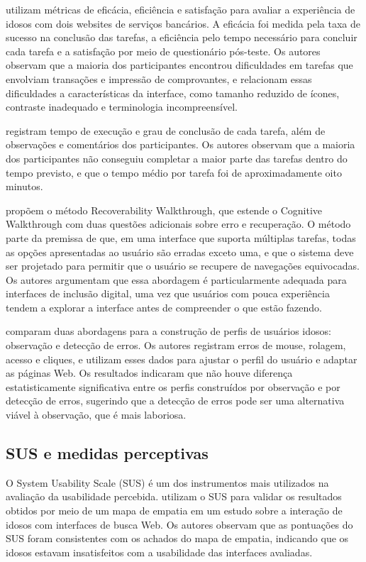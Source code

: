 \cite{gatsou2017seniors} utilizam métricas de eficácia, eficiência e satisfação para avaliar a experiência de idosos com dois websites de serviços bancários. A eficácia foi medida pela taxa de sucesso na conclusão das tarefas, a eficiência pelo tempo necessário para concluir cada tarefa e a satisfação por meio de questionário pós-teste. Os autores observam que a maioria dos participantes encontrou dificuldades em tarefas que envolviam transações e impressão de comprovantes, e relacionam essas dificuldades a características da interface, como tamanho reduzido de ícones, contraste inadequado e terminologia incompreensível.

\cite{xie2010usability} registram tempo de execução e grau de conclusão de cada tarefa, além de observações e comentários dos participantes. Os autores observam que a maioria dos participantes não conseguiu completar a maior parte das tarefas dentro do tempo previsto, e que o tempo médio por tarefa foi de aproximadamente oito minutos.

\cite{filgueiras2009recoverability} propõem o método Recoverability Walkthrough, que estende o Cognitive Walkthrough com duas questões adicionais sobre erro e recuperação. O método parte da premissa de que, em uma interface que suporta múltiplas tarefas, todas as opções apresentadas ao usuário são erradas exceto uma, e que o sistema deve ser projetado para permitir que o usuário se recupere de navegações equivocadas. Os autores argumentam que essa abordagem é particularmente adequada para interfaces de inclusão digital, uma vez que usuários com pouca experiência tendem a explorar a interface antes de compreender o que estão fazendo.

\cite{taylor2009using} comparam duas abordagens para a construção de perfis de usuários idosos: observação e detecção de erros. Os autores registram erros de mouse, rolagem, acesso e cliques, e utilizam esses dados para ajustar o perfil do usuário e adaptar as páginas Web. Os resultados indicaram que não houve diferença estatisticamente significativa entre os perfis construídos por observação e por detecção de erros, sugerindo que a detecção de erros pode ser uma alternativa viável à observação, que é mais laboriosa.

\subsection{SUS e medidas perceptivas}

\label{sec:sus}

O System Usability Scale (SUS) é um dos instrumentos mais utilizados na avaliação da usabilidade percebida. \cite{allah2021empathy} utilizam o SUS para validar os resultados obtidos por meio de um mapa de empatia em um estudo sobre a interação de idosos com interfaces de busca Web. Os autores observam que as pontuações do SUS foram consistentes com os achados do mapa de empatia, indicando que os idosos estavam insatisfeitos com a usabilidade das interfaces avaliadas.

